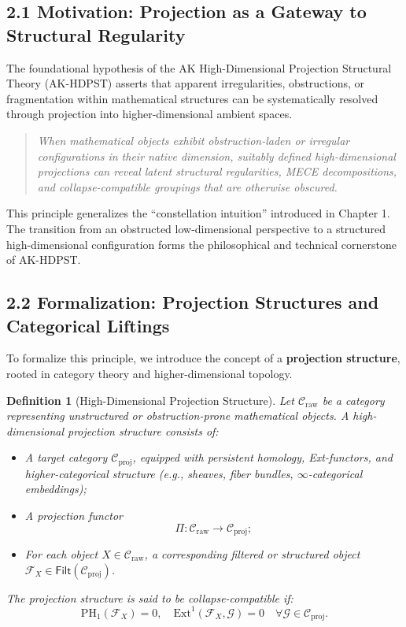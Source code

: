 \documentclass[11pt]{article}
\newtheorem{definition}[theorem]{Definition}
\begin{document}
\subsection*{2.1 Motivation: Projection as a Gateway to Structural Regularity}

The foundational hypothesis of the AK High-Dimensional Projection Structural Theory (AK-HDPST) asserts that apparent irregularities, obstructions, or fragmentation within mathematical structures can be systematically resolved through projection into higher-dimensional ambient spaces.

\begin{quote}
\textit{
When mathematical objects exhibit obstruction-laden or irregular configurations in their native dimension,  
suitably defined high-dimensional projections can reveal latent structural regularities, MECE decompositions,  
and collapse-compatible groupings that are otherwise obscured.
}
\end{quote}

This principle generalizes the ``constellation intuition'' introduced in Chapter 1. The transition from an obstructed low-dimensional perspective to a structured high-dimensional configuration forms the philosophical and technical cornerstone of AK-HDPST.

\subsection*{2.2 Formalization: Projection Structures and Categorical Liftings}

To formalize this principle, we introduce the concept of a \textbf{projection structure}, rooted in category theory and higher-dimensional topology.

\begin{definition}[High-Dimensional Projection Structure]
Let \( \mathcal{C}_{\mathrm{raw}} \) be a category representing unstructured or obstruction-prone mathematical objects.  
A \emph{high-dimensional projection structure} consists of:

\begin{itemize}
    \item A target category \( \mathcal{C}_{\mathrm{proj}} \), equipped with persistent homology, Ext-functors, and higher-categorical structure (e.g., sheaves, fiber bundles, $\infty$-categorical embeddings);
    \item A projection functor
    \[
    \Pi : \mathcal{C}_{\mathrm{raw}} \longrightarrow \mathcal{C}_{\mathrm{proj}};
    \]
    \item For each object \( X \in \mathcal{C}_{\mathrm{raw}} \), a corresponding filtered or structured object \( \mathcal{F}_X \in \mathsf{Filt}(\mathcal{C}_{\mathrm{proj}}) \).
\end{itemize}

The projection structure is said to be \emph{collapse-compatible} if:
\[
\mathrm{PH}_1(\mathcal{F}_X) = 0, \quad \mathrm{Ext}^1(\mathcal{F}_X, \mathcal{G}) = 0 \quad \forall \mathcal{G} \in \mathcal{C}_{\mathrm{proj}}.
\]
\end{definition}
\end{document}

